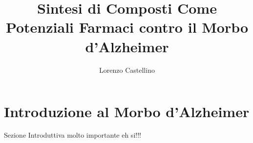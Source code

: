\documentclass{article}
\title{Sintesi di Composti Come Potenziali Farmaci contro il Morbo d'Alzheimer}
\author{Lorenzo Castellino}
\begin{document}
\maketitle
\newpage
{}
\tableofcontents
\newpage
\section{Introduzione al Morbo d'Alzheimer}
Sezione Introduttiva molto importante eh si!!!
\end{document}
